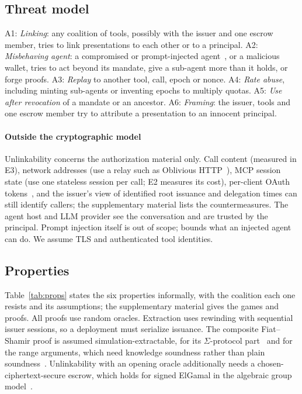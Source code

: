\subsection{Threat model}
A1: \emph{Linking}: any coalition of tools, possibly with the issuer and one escrow member, tries to link presentations to each other or to a principal. A2: \emph{Misbehaving agent}: a compromised or prompt-injected agent~\cite{greshake2023injection}, or a malicious wallet, tries to act beyond its mandate, give a sub-agent more than it holds, or forge proofs. A3: \emph{Replay} to another tool, call, epoch or nonce. A4: \emph{Rate abuse}, including minting sub-agents or inventing epochs to multiply quotas. A5: \emph{Use after revocation} of a mandate or an ancestor. A6: \emph{Framing}: the issuer, tools and one escrow member try to attribute a presentation to an innocent principal.

\paragraph*{Outside the cryptographic model} Unlinkability concerns the authorization material only. Call content (measured in E3), network addresses (use a relay such as Oblivious HTTP~\cite{rfc9458}), MCP session state (use one stateless session per call; E2 measures its cost), per-client OAuth tokens~\cite{mcpauth}, and the issuer's view of identified root issuance and delegation times can still identify callers; the supplementary material lists the countermeasures. The agent host and LLM provider see the conversation and are trusted by the principal.
Prompt injection itself is out of scope; \sys{} bounds what an injected agent can do. We assume TLS and authenticated tool identities.

\subsection{Properties}\label{sec:defs}
Table~\ref{tab:props} states the six properties informally, with the coalition each one resists and its assumptions; the supplementary material gives the games and proofs. All proofs use random oracles. Extraction uses rewinding with sequential issuer sessions, so a deployment must serialize issuance. The composite Fiat--Shamir proof is assumed simulation-extractable, for its $\Sigma$-protocol part~\cite{faust2012fsnm} and for the range arguments, which need knowledge soundness rather than plain soundness~\cite{attema2022fsmulti,ganesh2022bpse}. Unlinkability with an opening oracle additionally needs a chosen-ciphertext-secure escrow, which holds for signed ElGamal in the algebraic group model~\cite{fuchsbauer2020schnorr}.

